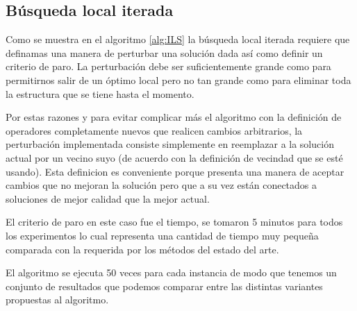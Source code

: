 \subsection*{Búsqueda local iterada}
Como se muestra en el algoritmo \ref{alg:ILS} la búsqueda local iterada requiere que definamas una manera de perturbar una solución dada así como definir un criterio de paro. La perturbación debe ser suficientemente grande como para permitirnos salir de un óptimo local pero no tan grande como para eliminar toda la estructura que se tiene hasta el momento.

Por estas razones y para evitar complicar más el algoritmo con la definición de operadores completamente nuevos que realicen cambios arbitrarios, la perturbación implementada consiste simplemente en reemplazar a la solución actual por un vecino suyo (de acuerdo con la definición de vecindad que se esté usando). Esta definicion es conveniente porque presenta una manera de aceptar cambios que no mejoran la solución pero que a su vez están conectados a soluciones de mejor calidad que la mejor actual.

 El criterio de paro en este caso fue el tiempo, se tomaron 5 minutos para todos los experimentos lo cual representa una cantidad de tiempo muy pequeña comparada con la requerida por los métodos del estado del arte.

El algoritmo se ejecuta 50 veces para cada instancia de modo que tenemos un conjunto de resultados que podemos comparar entre las distintas variantes propuestas al algoritmo.
